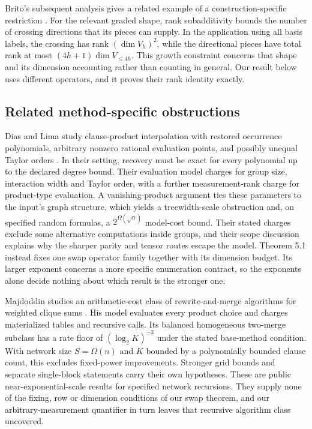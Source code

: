 \documentclass[11pt,letterpaper]{article}
\begin{document}
Brito's subsequent analysis gives a related example of a
construction-specific restriction \citep{Brito26}. For the relevant
graded shape, rank subadditivity bounds the number of crossing
directions that its pieces can supply. In the application using all
basis labels, the crossing has rank \((\dim V_h)^2\), while the
directional pieces have total rank at most \((4h+1)\dim V_{\le4h}\).
This growth constraint concerns that shape and its dimension accounting
rather than counting in general. Our result below uses different
operators, and it proves their rank identity exactly.

\subsection{Related method-specific
obstructions}\label{related-method-specific-obstructions}

Dias and Lima study clause-product interpolation with restored
occurrence polynomials, arbitrary nonzero rational evaluation points,
and possibly unequal Taylor orders \citep[Sections 5--9]{DL26}. In their
setting, recovery must be exact for every polynomial up to the declared
degree bound. Their evaluation model charges for group size, interaction
width and Taylor order, with a further measurement-rank charge for
product-type evaluation. A vanishing-product argument ties these
parameters to the input's graph structure, which yields a
treewidth-scale obstruction and, on specified random formulas, a
\(2^{\Omega(\sqrt n)}\) model-cost bound. Their stated charges exclude
some alternative computations inside groups, and their scope discussion
explains why the sharper parity and tensor routes escape the model.
Theorem 5.1 instead fixes one swap operator family together with its
dimension budget. Its larger exponent concerns a more specific
enumeration contract, so the exponents alone decide nothing about which
result is the stronger one.

Majdoddin studies an arithmetic-cost class of rewrite-and-merge
algorithms for weighted clique sums \citep[Definition 4.2 and Section
4]{Maj26}. His model evaluates every product choice and charges
materialized tables and recursive calls. Its balanced homogeneous
two-merge subclass has a rate floor of \((\log_2K)^{-3}\) under the
stated base-method condition. With network size \(S=\Omega(n)\) and
\(K\) bounded by a polynomially bounded clause count, this excludes
fixed-power improvements. Stronger grid bounds and separate single-block
statements carry their own hypotheses. These are public
near-exponential-scale results for specified network recursions. They
supply none of the fixing, row or dimension conditions of our swap
theorem, and our arbitrary-measurement quantifier in turn leaves that
recursive algorithm class uncovered.
\end{document}
